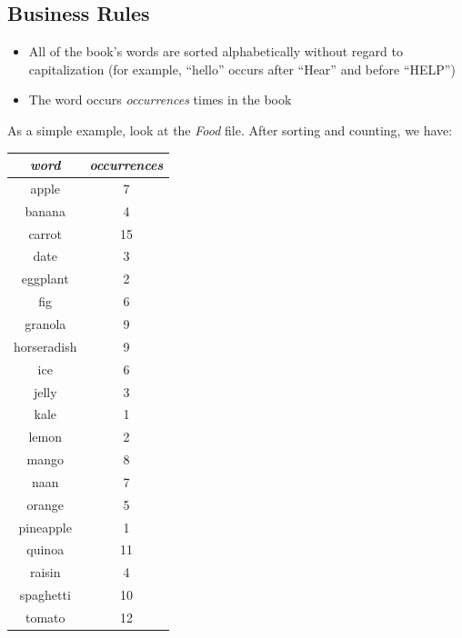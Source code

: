 \subsection{Business Rules} \label{subsec:BusinessRules}


\begin{itemize}
    \item All of the book's words are sorted alphabetically without regard to capitalization (for example, ``hello'' occurs after ``Hear'' and before ``HELP'')
    \item The word occurs \textit{occurrences} times in the book
\end{itemize}

As a simple example, look at the \textit{Food} file.
After sorting and counting, we have:

\begin{center}
    \begin{tabular}{cc}
        \textit{word} & \textit{occurrences} \\ \hline
        apple       & 7 \\
        banana      & 4 \\
        carrot      & 15 \\
        date        & 3 \\
        eggplant    & 2 \\
        fig         & 6 \\
        granola     & 9 \\
        horseradish & 9 \\
        ice         & 6 \\
        jelly       & 3 \\
        kale        & 1 \\
        lemon       & 2 \\
        mango       & 8 \\
        naan        & 7 \\
        orange      & 5 \\
        pineapple   & 1 \\
        quinoa      & 11 \\
        raisin      & 4 \\
        spaghetti   & 10 \\
        tomato      & 12 \\
    \end{tabular}
\end{center}

